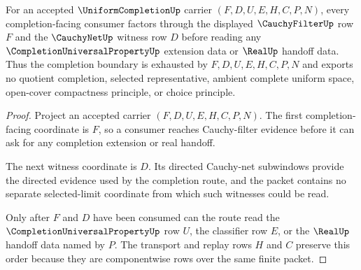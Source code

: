 \begin{theorem}
\label{thm:uniform-completion-cauchy-filter-factorization}
For an accepted $\UniformCompletionUp$ carrier
$(F,D,U,E,H,C,P,N)$, every completion-facing consumer factors through the
displayed $\CauchyFilterUp$ row $F$ and the $\CauchyNetUp$ witness row $D$
before reading any $\CompletionUniversalPropertyUp$ extension data or
$\RealUp$ handoff data. Thus the completion boundary is exhausted by
$F,D,U,E,H,C,P,N$ and exports no quotient completion, selected representative,
ambient complete uniform space, open-cover compactness principle, or choice
principle.
\end{theorem}
\begin{proof}
Project an accepted carrier $(F,D,U,E,H,C,P,N)$. The first completion-facing
coordinate is $F$, so a consumer reaches Cauchy-filter evidence before it can
ask for any completion extension or real handoff.

The next witness coordinate is $D$. Its directed Cauchy-net subwindows provide
the directed evidence used by the completion route, and the packet contains no
separate selected-limit coordinate from which such witnesses could be read.

Only after $F$ and $D$ have been consumed can the route read the
$\CompletionUniversalPropertyUp$ row $U$, the classifier row $E$, or the
$\RealUp$ handoff data named by $P$. The transport and replay rows $H$ and $C$
preserve this order because they are componentwise rows over the same finite
packet.
\end{proof}

